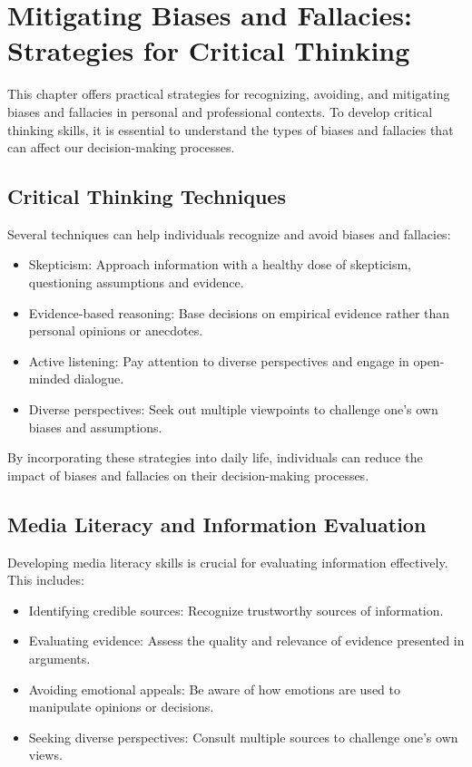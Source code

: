 \chapter{Mitigating Biases and Fallacies: Strategies for Critical Thinking}

This chapter offers practical strategies for recognizing, avoiding, and mitigating biases and fallacies in personal and professional contexts. To develop critical thinking skills, it is essential to understand the types of biases and fallacies that can affect our decision-making processes.

\section{Critical Thinking Techniques}

Several techniques can help individuals recognize and avoid biases and fallacies:

\begin{itemize}
    \item Skepticism: Approach information with a healthy dose of skepticism, questioning assumptions and evidence.
    \item Evidence-based reasoning: Base decisions on empirical evidence rather than personal opinions or anecdotes.
    \item Active listening: Pay attention to diverse perspectives and engage in open-minded dialogue.
    \item Diverse perspectives: Seek out multiple viewpoints to challenge one's own biases and assumptions.
\end{itemize}

By incorporating these strategies into daily life, individuals can reduce the impact of biases and fallacies on their decision-making processes.

\section{Media Literacy and Information Evaluation}

Developing media literacy skills is crucial for evaluating information effectively. This includes:

\begin{itemize}
    \item Identifying credible sources: Recognize trustworthy sources of information.
    \item Evaluating evidence: Assess the quality and relevance of evidence presented in arguments.
    \item Avoiding emotional appeals: Be aware of how emotions are used to manipulate opinions or decisions.
    \item Seeking diverse perspectives: Consult multiple sources to challenge one's own views.
\end{itemize}

